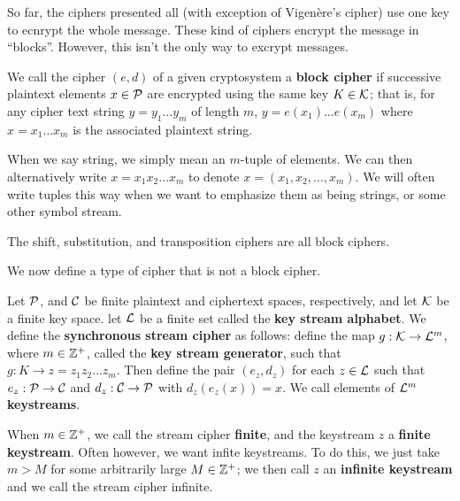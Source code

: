 So far, the ciphers presented all (with exception of Vigen\`ere's cipher) use
one key to ecnrypt the whole message. These kind of ciphers encrypt the message
in ``blocks''. However, this isn't the only way to excrypt messages.

\begin{definition}
    We call the cipher $(e,d)$ of a given cryptosystem a \textbf{block cipher}
    if successive plaintext elements $x \in \mathcal{P}$ are encrypted using the same
    key  $K \in \mathcal{K}$; that is, for any cipher text string  $y=y_1 \dots y_m$ of
    length $m$,  $y=e(x_1) \dots e(x_m)$ where $x=x_1 \dots x_m$ is the
    associated plaintext string.
\end{definition}
\begin{remark}
    When we say string, we simply mean an $m$-tuple of elements. We can then
    alternatively write  $x=x_1x_2 \dots x_m$ to denote $x=
    (x_1, x_2, \dots, x_m)$. We will often write tuples this way when we want to
    emphasize them as being strings, or some other symbol stream.
\end{remark}

\begin{example}
    The shift, substitution, and transposition ciphers are all block ciphers.
\end{example}

We now define a type of cipher that is not a block cipher.

\begin{definition}
    Let $\mathcal{P}$, and $\mathcal{C}$ be finite plaintext and ciphertext spaces,
    respectively, and let $\mathcal{K}$ be a finite key space. let  $\mathcal{L}$ be a finite
    set called the  \textbf{key stream alphabet}. We define the
    \textbf{synchronous stream cipher} as follows: define the map $g:\mathcal{K}
    \rightarrow \mathcal{L}^m$, where $m \in \mathbb{Z}^+$, called the \textbf{key stream
    generator}, such that $g:K \rightarrow z=z_1z_2 \dots z_m$. Then define the
    pair $(e_z,d_z)$ for each $z \in \mathcal{L}$ such that $e_z:\mathcal{P} \rightarrow \mathcal{C}$
    and $d_z:\mathcal{C} \rightarrow \mathcal{P}$ with $d_z(e_z(x))=x$. We call elements of
    $\mathcal{L}^m$  \textbf{keystreams}.
\end{definition}
\begin{remark}
    When $m \in \mathbb{Z}^+$, we call the stream cipher  \textbf{finite}, and the
    keystream $z$ a  \textbf{finite keystream}. Often however, we want infite
    keystreams. To do this, we just take $m>M$ for some arbitrarily large  $M
    \in \mathbb{Z}^+$; we then call  $z$ an  \textbf{infinite keystream} and we call the
    stream cipher infinite.
\end{remark}

